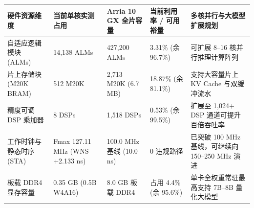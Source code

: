 \documentclass[11pt,a4paper]{article}
\begin{document}
{\footnotesize\renewcommand{\arraystretch}{1.14}\begin{longtable}{@{}L{0.19\textwidth}L{0.16\textwidth}L{0.16\textwidth}L{0.15\textwidth}L{0.24\textwidth}@{}}\toprule

\textbf{硬件资源维度} & \textbf{当前单核实测占用} & \textbf{Arria 10 GX 全片容量} & \textbf{当前利用率 /\allowbreak{} 可用裕量} & \textbf{多核并行与大模型扩展规划}\\\midrule\endhead

自适应逻辑模块 (\allowbreak{}ALMs)\allowbreak{} & 14,\allowbreak{}138 ALMs & 427,\allowbreak{}200 ALMs & 3.31\% (\allowbreak{}余 96.7\%)\allowbreak{} & 可扩展 8–16 核并行推理计算阵列\\[2pt]

片上存储块 (\allowbreak{}M20K BRAM)\allowbreak{} & 512 M20K & 2,\allowbreak{}713 M20K (\allowbreak{}6.7 MB)\allowbreak{} & 18.87\% (\allowbreak{}余 81.1\%)\allowbreak{} & 支持大容量片上 KV Cache 与双缓冲流水\\[2pt]

精度可调 DSP 乘加器 & 8 DSPs & 1,\allowbreak{}518 DSPs & 0.53\% (\allowbreak{}余 99.5\%)\allowbreak{} & 扩展至 1,\allowbreak{}024+\allowbreak{} DSP 通道可提升百倍吞吐率\\[2pt]

工作时钟与静态时序 (\allowbreak{}STA)\allowbreak{} & Fmax 127.11 MHz (\allowbreak{}WNS +\allowbreak{}2.133 ns)\allowbreak{} & 100.0 MHz 基线 (\allowbreak{}10.0 ns)\allowbreak{} & 0 违规路径 & 已突破 100 MHz 基线，可继续向 150–250 MHz 演进\\[2pt]

板载 DDR4 显存容量 & 0.35 GB (\allowbreak{}0.5B W4A16)\allowbreak{} & 8.0 GB 板载 DDR4 & 占用 4.4\% (\allowbreak{}余 95.6\%)\allowbreak{} & 单卡全权重常驻最高支持 7B–8B 量化大模型\\[2pt]

\bottomrule\end{longtable}}
\end{document}
